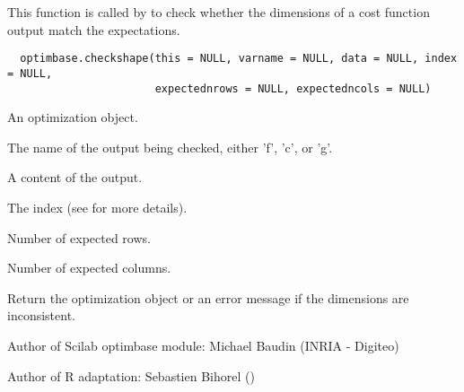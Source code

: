 %
\begin{Description}\relax
This function is called by  to check whether the
dimensions of a cost function output match the expectations.
\end{Description}
%
\begin{Usage}
\begin{verbatim}
  optimbase.checkshape(this = NULL, varname = NULL, data = NULL, index = NULL,
                       expectednrows = NULL, expectedncols = NULL)
\end{verbatim}
\end{Usage}
%
\begin{Arguments}
\begin{ldescription}
\item[\code{this}] An optimization object.
\item[\code{varname}] The name of the output being checked, either 'f', 'c', or 'g'.
\item[\code{data}] A content of the output.
\item[\code{index}] The index (see 
for more details).
\item[\code{expectednrows}] Number of expected rows.
\item[\code{expectedncols}] Number of expected columns.
\end{ldescription}
\end{Arguments}
%
\begin{Value}
Return the optimization object or an error message if the dimensions are
inconsistent.
\end{Value}
%
\begin{Author}\relax
Author of Scilab optimbase module: Michael Baudin (INRIA - Digiteo)

Author of R adaptation: Sebastien Bihorel ()
\end{Author}
%
\begin{SeeAlso}\relax
{}
\end{SeeAlso}
